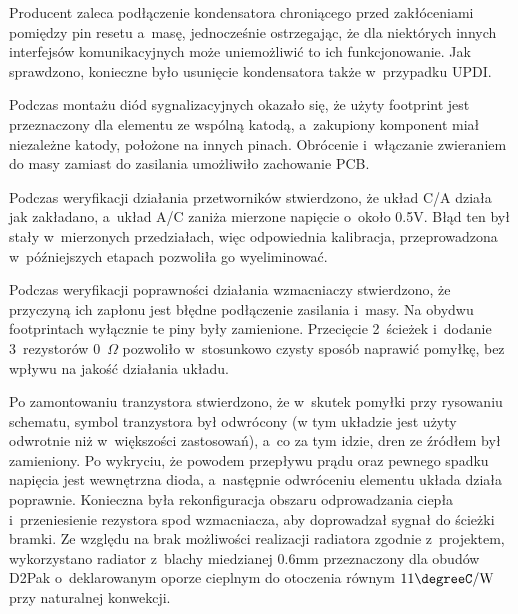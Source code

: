 \documentclass[polish,engineer]{polsl-msth}
\begin{document}
Producent zaleca podłączenie kondensatora chroniącego przed zakłóceniami pomiędzy pin resetu a~masę, jednocześnie ostrzegając, że dla niektórych innych interfejsów komunikacyjnych może uniemożliwić to ich funkcjonowanie\cite{avr_hardware}. Jak sprawdzono, konieczne było usunięcie kondensatora także w~przypadku UPDI.

Podczas montażu diód sygnalizacyjnych okazało się, że użyty footprint jest przeznaczony dla elementu ze wspólną katodą, a~zakupiony komponent miał niezależne katody, położone na innych pinach. Obrócenie i~włączanie zwieraniem do masy zamiast do zasilania umożliwiło zachowanie PCB.

Podczas weryfikacji działania przetworników stwierdzono, że układ C/A działa jak zakładano, a~układ A/C zaniża mierzone napięcie o~około 0.5V. Błąd ten był stały w~mierzonych przedziałach, więc odpowiednia kalibracja, przeprowadzona w~późniejszych etapach pozwoliła go wyeliminować.

Podczas weryfikacji poprawności działania wzmacniaczy stwierdzono, że przyczyną ich zapłonu jest błędne podłączenie zasilania i~masy. Na obydwu footprintach wyłącznie te piny były zamienione. Przecięcie 2~ścieżek i~dodanie 3~rezystorów 0~$\Omega$ pozwoliło w~stosunkowo czysty sposób naprawić pomyłkę, bez wpływu na jakość działania układu.

Po zamontowaniu tranzystora stwierdzono, że w~skutek pomyłki przy rysowaniu schematu, symbol tranzystora był odwrócony (w tym układzie jest użyty odwrotnie niż w~większości zastosowań), a~co za tym idzie, dren ze źródłem był zamieniony. Po wykryciu, że powodem przepływu prądu oraz pewnego spadku napięcia jest wewnętrzna dioda, a~następnie odwróceniu elementu układa działa poprawnie. Konieczna była rekonfiguracja obszaru odprowadzania ciepła i~przeniesienie rezystora spod wzmacniacza, aby doprowadzał sygnał do ścieżki bramki. Ze względu na brak możliwości realizacji radiatora zgodnie z~projektem, wykorzystano radiator z~blachy miedzianej 0.6mm przeznaczony dla obudów D2Pak o~deklarowanym oporze cieplnym do otoczenia równym $\mathrm{11\degreeC/W}$ przy naturalnej konwekcji. 
\end{document}
